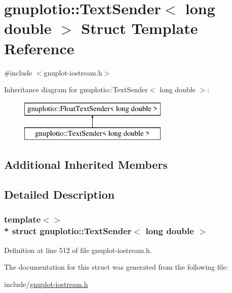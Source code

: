 \hypertarget{structgnuplotio_1_1_text_sender_3_01long_01double_01_4}{}\section{gnuplotio\+:\+:Text\+Sender$<$ long double $>$ Struct Template Reference}
\label{structgnuplotio_1_1_text_sender_3_01long_01double_01_4}


{\ttfamily \#include $<$gnuplot-\/iostream.\+h$>$}

Inheritance diagram for gnuplotio\+:\+:Text\+Sender$<$ long double $>$\+:\begin{figure}[H]
\begin{center}
\leavevmode
\includegraphics[height=2.000000cm]{structgnuplotio_1_1_text_sender_3_01long_01double_01_4}
\end{center}
\end{figure}
\subsection*{Additional Inherited Members}


\subsection{Detailed Description}
\subsubsection*{template$<$$>$\\*
struct gnuplotio\+::\+Text\+Sender$<$ long double $>$}



Definition at line 512 of file gnuplot-\/iostream.\+h.



The documentation for this struct was generated from the following file\+:\begin{DoxyCompactItemize}
\item 
include/\hyperlink{gnuplot-iostream_8h}{gnuplot-\/iostream.\+h}\end{DoxyCompactItemize}
